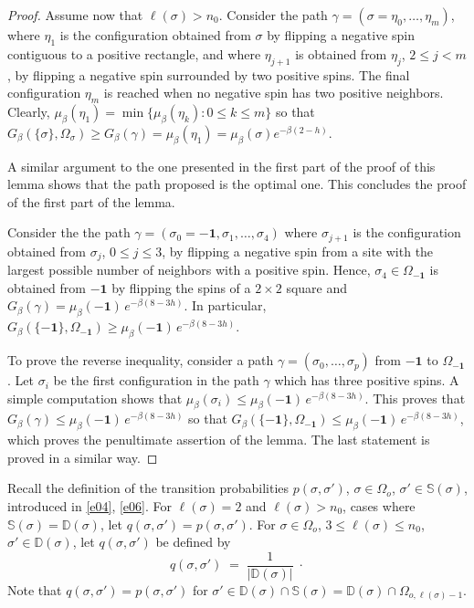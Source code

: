 \documentclass[reqno]{amsart}
\begin{document}
\begin{proof}
Assume now that $\ell (\sigma) > n_0$. Consider the path $\gamma =
(\sigma = \eta_0, \dots, \eta_m)$, where $\eta_1$ is the configuration
obtained from $\sigma$ by flipping a negative spin contiguous to a
positive rectangle, and where $\eta_{j+1}$ is obtained from $\eta_j$,
$2\le j<m$, by flipping a negative spin surrounded by two positive
spins. The final configuration $\eta_m$ is reached when no negative
spin has two positive neighbors.  Clearly, $\mu_\beta(\eta_{1}) =
\min\{\mu_\beta(\eta_k) : 0\le k\le m\}$ so that $G_\beta(\{\sigma\} ,
\Omega_\sigma) \ge G_\beta(\gamma) = \mu_\beta(\eta_{1}) =
\mu_\beta(\sigma) e^{-\beta (2-h)}$.

A similar argument to the one presented in the first part of the proof
of this lemma shows that the path proposed is the optimal one. This
concludes the proof of the first part of the lemma.

Consider the the path $\gamma = (\sigma_0= -{{\mathbf 1}}, \sigma_1, \dots,
\sigma_4)$ where $\sigma_{j+1}$ is the configuration obtained from
$\sigma_j$, $0\le j\le 3$, by flipping a negative spin from a site
with the largest possible number of neighbors with a positive
spin. Hence, $\sigma_4\in \Omega_{-{{\mathbf 1}}}$ is obtained from $-{{\mathbf 1}}$
by flipping the spins of a $2\times 2$ square and $G_\beta(\gamma)=
\mu_\beta (-{{\mathbf 1}}) \, e^{- \beta (8-3 h)}$. In particular,
$G_\beta(\{-{{\mathbf 1}}\} , \Omega_{-{{\mathbf 1}}}) \ge \mu_\beta (-{{\mathbf 1}}) \,
e^{- \beta (8-3 h)}$.

To prove the reverse inequality, consider a path $\gamma =
(\sigma_0, \dots, \sigma_p)$ from $-{{\mathbf 1}}$ to $\Omega_{-{{\mathbf 1}}}$. Let
$\sigma_i$ be the first configuration in the path $\gamma$ which has
three positive spins. A simple computation shows that $\mu_\beta
(\sigma_i) \le \mu_\beta (-{{\mathbf 1}}) \, e^{- \beta (8-3 h)}$. This proves
that $G_\beta(\gamma) \le \mu_\beta (-{{\mathbf 1}}) \, e^{- \beta (8-3 h)}$
so that $G_\beta(\{-{{\mathbf 1}}\} , \Omega_{-{{\mathbf 1}}}) \le \mu_\beta (-{{\mathbf 1}})
\, e^{- \beta (8-3 h)}$, which proves the penultimate assertion of the
lemma. The last statement is proved in a similar way. 
\end{proof} 

Recall the definition of the transition probabilities $p(\sigma,
\sigma')$, $\sigma\in \Omega_o$, $\sigma'\in {{\mathbb S}}(\sigma)$,
introduced in \eqref{e04}, \eqref{e06}. For $\ell(\sigma) =2$ and
$\ell(\sigma)>n_0$, cases where ${{\mathbb S}}(\sigma) = {{\mathbb D}}(\sigma)$, let
$q(\sigma, \sigma')=p(\sigma, \sigma')$. For $\sigma\in \Omega_o$,
$3\le \ell(\sigma) \le n_0$, $\sigma'\in {{\mathbb D}}(\sigma)$, let
$q(\sigma, \sigma')$ be defined by
\begin{equation*}
q(\sigma, \sigma')\;=\; \frac 1{|{{\mathbb D}}(\sigma)|}\;\cdot
\end{equation*}
Note that $q(\sigma, \sigma') = p(\sigma, \sigma')$ for $\sigma'\in
{{\mathbb D}}(\sigma) \cap {{\mathbb S}}(\sigma) = {{\mathbb D}}(\sigma) \cap
\Omega_{o,\ell(\sigma)-1}$.
\end{document}
